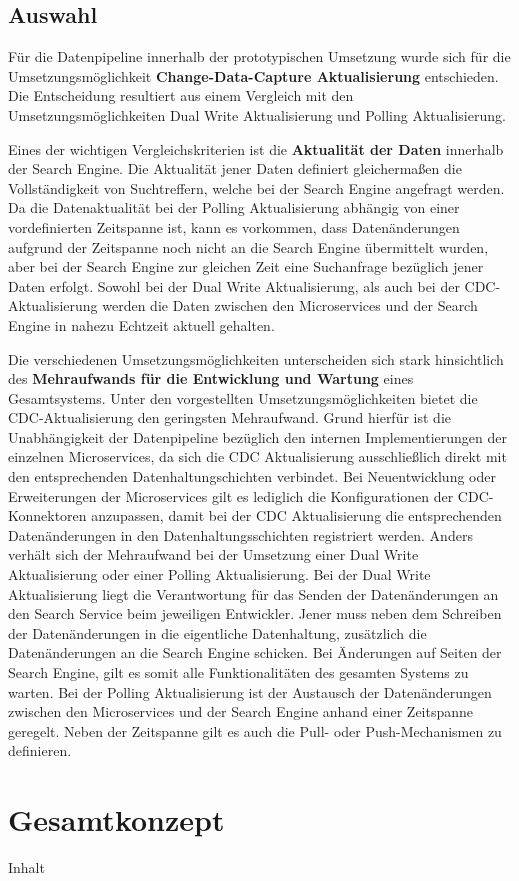 \subsection{Auswahl\label{subsec4.2.5:Unterunterpunkt-5}}

Für die Datenpipeline innerhalb der prototypischen Umsetzung wurde sich für die Umsetzungsmöglichkeit \glqq \textbf{Change-Data-Capture Aktualisierung}\grqq{} entschieden. Die Entscheidung resultiert aus einem Vergleich mit den Umsetzungsmöglichkeiten \glqq Dual Write Aktualisierung\grqq{} und \glqq Polling Aktualisierung\grqq{}.

Eines der wichtigen Vergleichskriterien ist die \textbf{Aktualität der Daten} innerhalb der Search Engine. Die Aktualität jener Daten definiert gleichermaßen die Vollständigkeit von Suchtreffern, welche bei der Search Engine angefragt werden. Da die Datenaktualität bei der Polling Aktualisierung abhängig von einer vordefinierten Zeitspanne ist, kann es vorkommen, dass Datenänderungen aufgrund der Zeitspanne noch nicht an die Search Engine übermittelt wurden, aber bei der Search Engine zur gleichen Zeit eine Suchanfrage bezüglich jener Daten erfolgt. Sowohl bei der Dual Write Aktualisierung, als auch bei der CDC-Aktualisierung werden die Daten zwischen den Microservices und der Search Engine in nahezu Echtzeit aktuell gehalten.

Die verschiedenen Umsetzungsmöglichkeiten unterscheiden sich stark hinsichtlich des \textbf{Mehraufwands für die Entwicklung und Wartung} eines Gesamtsystems. Unter den vorgestellten Umsetzungsmöglichkeiten bietet die CDC-Aktualisierung den geringsten Mehraufwand. Grund hierfür ist die Unabhängigkeit der Datenpipeline bezüglich den internen Implementierungen der einzelnen Microservices, da sich die CDC Aktualisierung ausschließlich direkt mit den entsprechenden Datenhaltungschichten verbindet. Bei Neuentwicklung oder Erweiterungen der Microservices gilt es lediglich die Konfigurationen der CDC-Konnektoren anzupassen, damit bei der CDC Aktualisierung die entsprechenden Datenänderungen in den Datenhaltungsschichten registriert werden. Anders verhält sich der Mehraufwand bei der Umsetzung einer Dual Write Aktualisierung oder einer Polling Aktualisierung. Bei der Dual Write Aktualisierung liegt die Verantwortung für das Senden der Datenänderungen an den Search Service beim jeweiligen Entwickler. Jener muss neben dem Schreiben der Datenänderungen in die eigentliche Datenhaltung, zusätzlich die Datenänderungen an die Search Engine schicken. Bei Änderungen auf Seiten der Search Engine, gilt es somit alle Funktionalitäten des gesamten Systems zu warten. Bei der Polling Aktualisierung ist der Austausch der Datenänderungen zwischen den Microservices und der Search Engine anhand einer Zeitspanne geregelt. Neben der Zeitspanne gilt es auch die Pull- oder Push-Mechanismen zu definieren.

\section{Gesamtkonzept\label{sec4.3:Unterpunkt-3}}

Inhalt